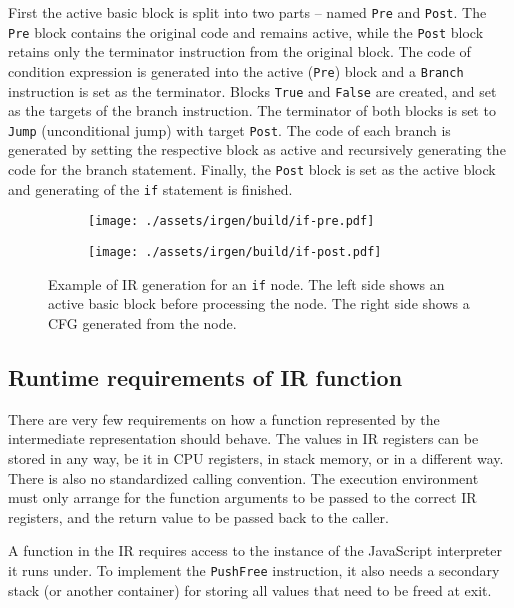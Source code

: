 First the active basic block is split into two parts -- named \texttt{Pre} and \texttt{Post}. The \texttt{Pre} block contains the original code and remains active, while the \texttt{Post} block retains only the terminator instruction from the original block. The code of condition expression is generated into the active (\texttt{Pre}) block and a \texttt{Branch} instruction is set as the terminator. Blocks \texttt{True} and \texttt{False} are created, and set as the targets of the branch instruction. The terminator of both blocks is set to \texttt{Jump} (unconditional jump) with target \texttt{Post}. The code of each branch is generated by setting the respective block as active and recursively generating the code for the branch statement. Finally, the \texttt{Post} block is set as the active block and generating of the \texttt{if} statement is finished.

\begin{figure}
    \centering
    \begin{subfigure}[a]{0.48\textwidth}
        \centering
        \texttt{[image: ./assets/irgen/build/if-pre.pdf]}
    \end{subfigure}
    \begin{subfigure}[a]{0.48\textwidth}
        \centering
        \texttt{[image: ./assets/irgen/build/if-post.pdf]}
    \end{subfigure}
    \caption{Example of IR generation for an \texttt{if} node. The left side shows an active basic block before processing the node. The right side shows a CFG generated from the node.}
    \label{fig:irgen:if}
\end{figure}


\subsection{Runtime requirements of IR function}\label{subsec:irruntime}

There are very few requirements on how a function represented by the intermediate representation should behave. The values in IR registers can be stored in any way, be it in CPU registers, in stack memory, or in a different way. There is also no standardized calling convention. The execution environment must only arrange for the function arguments to be passed to the correct IR registers, and the return value to be passed back to the caller.

A function in the IR requires access to the instance of the JavaScript interpreter it runs under. To implement the \texttt{PushFree} instruction, it also needs a secondary stack (or another container) for storing all values that need to be freed at exit.


